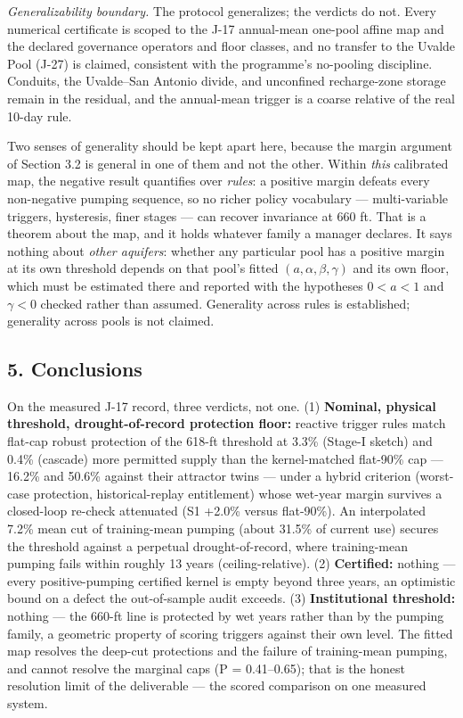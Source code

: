 \documentclass[11pt]{article}
\begin{document}
\emph{Generalizability boundary.} The protocol generalizes; the verdicts
do not. Every numerical certificate is scoped to the J-17 annual-mean
one-pool affine map and the declared governance operators and floor
classes, and no transfer to the Uvalde Pool (J-27) is claimed,
consistent with the programme's no-pooling discipline. Conduits, the
Uvalde--San Antonio divide, and unconfined recharge-zone storage remain
in the residual, and the annual-mean trigger is a coarse relative of the
real 10-day rule.

Two senses of generality should be kept apart here, because the margin
argument of Section 3.2 is general in one of them and not the other.
Within \emph{this} calibrated map, the negative result quantifies over
\emph{rules}: a positive margin defeats every non-negative pumping
sequence, so no richer policy vocabulary --- multi-variable triggers,
hysteresis, finer stages --- can recover invariance at 660 ft. That is a
theorem about the map, and it holds whatever family a manager declares.
It says nothing about \emph{other aquifers}: whether any particular pool
has a positive margin at its own threshold depends on that pool's fitted
\((a, \alpha, \beta, \gamma)\) and its own floor, which must be
estimated there and reported with the hypotheses \(0 < a < 1\) and
\(\gamma < 0\) checked rather than assumed. Generality across rules is
established; generality across pools is not claimed.

\subsection{5. Conclusions}\label{edw-conclusions}

On the measured J-17 record, three verdicts, not one. (1)
\textbf{Nominal, physical threshold, drought-of-record protection floor:} reactive
trigger rules match flat-cap robust protection of the 618-ft threshold
at 3.3\% (Stage-I sketch) and 0.4\% (cascade) more permitted supply than
the kernel-matched flat-90\% cap --- 16.2\% and 50.6\% against their
attractor twins --- under a hybrid criterion (worst-case protection,
historical-replay entitlement) whose wet-year margin survives a
closed-loop re-check attenuated (S1 +2.0\% versus flat-90\%). An
interpolated 7.2\% mean cut of training-mean pumping (about 31.5\% of
current use) secures the threshold against a perpetual
drought-of-record, where training-mean pumping fails within roughly 13
years (ceiling-relative). (2) \textbf{Certified:} nothing --- every
positive-pumping certified kernel is empty beyond three years, an
optimistic bound on a defect the out-of-sample audit exceeds. (3)
\textbf{Institutional threshold:} nothing --- the 660-ft line is
protected by wet years rather than by the pumping family, a geometric
property of scoring triggers against their own level. The fitted map
resolves the deep-cut protections and the failure of training-mean
pumping, and cannot resolve the marginal caps (P = 0.41--0.65); that is
the honest resolution limit of the deliverable --- the scored comparison
on one measured system.
\end{document}
